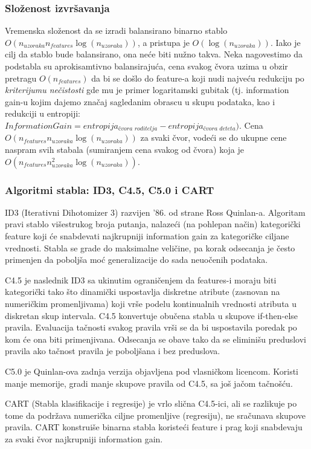 \documentclass[fontsize=12bp, paper=a4]{scrarticle}
\begin{document}
\subsubsection{Složenost izvršavanja}
Vremenska složenost da se izradi balansirano binarno stablo $O(n_{uzoraka}n_{features}\log(n_{uzoraka}))$, a pristupa je $O(\log(n_{uzoraka}))$.
Iako je cilj da stablo bude balansirano, ona neće biti nužno takva. Neka nagovestimo da podstabla su aprokisamtivno balansirajuća, cena svakog čvora uzima u obzir pretragu $O(n_{features})$ da bi se došlo do feature-a koji nudi najveću redukciju po \textit{kriterijumu nečistosti} gde mu je primer logaritamski gubitak (tj. information gain-u kojim dajemo značaj sagledanim obrascu u skupu podataka, kao i redukciji u entropiji: $Information Gain = entropija_\textit{čvora roditelja}-entropija_\textit{čvora deteta})$.
Cena $O(n_{features}n_{uzoraka}\log(n_{uzoraka}))$ za svaki čvor, vodeći se do ukupne cene naspram svih stabala (sumiranjem cena svakog od čvora) koja je $O(n_{features}n_{uzoraka}^{2}\log(n_{uzoraka}))$.

\subsubsection{Algoritmi stabla: ID3, C4.5, C5.0 i CART}

ID3 (Iterativni Dihotomizer 3) razvijen '86. od strane Ross Quinlan-a. Algoritam pravi stablo višestrukog broja putanja, nalazeći (na pohlepan način) kategorički feature koji će snabdevati najkrupniji information gain za kategoričke ciljane vrednosti. Stabla se grade do maksimalne veličine, pa korak odsecanja je često primenjen da poboljša moć generalizacije do sada neuočenih podataka.

C4.5 je naslednik ID3 sa ukinutim ograničenjem da features-i moraju biti kategorički tako što dinamički uspostavlja diskretne atribute (zasnovan na numeričkim promenljivama) koji vrše podelu kontinualnih vrednosti atributa u diskretan skup intervala. C4.5 konvertuje obučena stabla u skupove if-then-else pravila. Evaluacija tačnosti svakog pravila vrši se da bi uspostavila poredak po kom će ona biti primenjivana. Odsecanja se obave tako da se eliminišu preduslovi pravila ako tačnost pravila je poboljšana i bez preduslova.

C5.0 je Quinlan-ova zadnja verzija objavljena pod vlasničkom licencom. Koristi manje memorije, gradi manje skupove pravila od C4.5, sa još jačom tačnošću.

CART (Stabla klasifikacije i regresije) je vrlo slična C4.5-ici, ali se razlikuje po tome da podržava numerička ciljne promenljive (regresiju), ne sračunava skupove pravila. CART konstruiše binarna stabla koristeći feature i prag koji snabdevaju za svaki čvor najkrupniji information gain.
\end{document}
